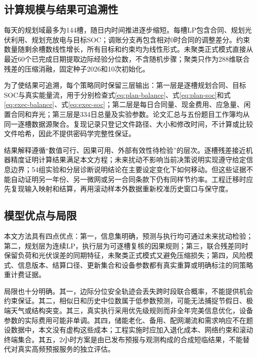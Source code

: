 \subsection{计算规模与结果可追溯性}

每天的规划域最多为144槽，随日内时间推进逐步缩短。每槽LP包含合同、规划光伏利用、规划充放电与目标SOC；调账分支再包含相对0时合同的调整差分。约束数量随剩余槽数线性增长，所有目标和约束均为线性形式。未聚类正式模式直接从最近60个已完成日期提取边际经验分位数，不含随机步骤；聚类只作为288维联合残差的压缩消融，固定种子2026和10次初始化。

为了使结果可追溯，每个策略同时保留三层输出：第一层是逐槽规划合同、目标SOC与真实能量流，用于分别检查式\eqref{eq:plan-balance}、式\eqref{eq:plan-soc}和式\eqref{eq:exec-balance}、式\eqref{eq:exec-soc}；第二层是每日合同量、现金费用、应急量、闲置合同和弃光；第三层是334日总量及实验参数。论文汇总与五份题目工作簿均从同一逐槽数据源聚合。复现记录只登记文件路径、大小和修改时间，不计算或比较文件哈希，因此不提供密码学完整性保证。

结果解释遵循“数值可行、因果可用、外部有效性待检验”的层次。逐槽残差接近机器精度证明计算结果满足本文方程；未来扰动不影响当前决策说明实现遵守给定信息边界；54组实验和分层诊断说明结论在主要设定变化下如何移动。但这些证据不能自动证明另一年份、另一微网或另一合同条款下仍有同样节约率。工程迁移时应先复现输入映射和结算，再用滚动样本外数据重新校准历史窗口与保守度。

\subsection{模型优点与局限}

本文方法具有四点优点：第一，信息集明确，预测与执行均可通过未来扰动检验；第二，规划层为连续LP，执行层为可逐槽复核的因果规则；第三，联合残差同时保留负荷和光伏误差的同期特征，未聚类正式模式又避免压缩损失；第四，风险模式、信息版本、结算口径、更新集合和设备参数都有真实重算或明确标注的同策略重计费证据。

局限也十分明确。其一，边际分位安全轨迹会丢失跨时段联合概率，不能提供机会约束保证。其二，相似日和历史中位数属于低参数预测，可能无法捕捉节假日、极端天气或结构突变。其三，真实执行采用优先级规则而非全年完美信息优化，设备参数的实际费用可能非单调。其四，储能老化、备用、配网潮流和需求响应不在题设数据中，本文没有虚构这些成本；工程实施时应加入退化成本、网络约束和滚动终端集合。其五，2小时方案是由已发布预报与观测构成的合成短临结果，不能替代对真实高频预报服务的独立评估。
